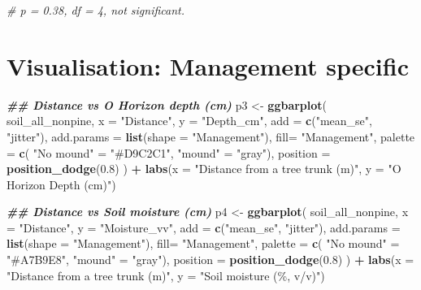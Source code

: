 \documentclass[
]{article}
\newenvironment{Shaded}{\begin{snugshade}}{\end{snugshade}}
\newcommand{\AttributeTok}[1]{\textcolor[rgb]{0.13,0.29,0.53}{#1}}
\newcommand{\CommentTok}[1]{\textcolor[rgb]{0.56,0.35,0.01}{\textit{#1}}}
\newcommand{\DocumentationTok}[1]{\textcolor[rgb]{0.56,0.35,0.01}{\textbf{\textit{#1}}}}
\newcommand{\FloatTok}[1]{\textcolor[rgb]{0.00,0.00,0.81}{#1}}
\newcommand{\FunctionTok}[1]{\textcolor[rgb]{0.13,0.29,0.53}{\textbf{#1}}}
\newcommand{\NormalTok}[1]{#1}
\newcommand{\OtherTok}[1]{\textcolor[rgb]{0.56,0.35,0.01}{#1}}
\newcommand{\SpecialCharTok}[1]{\textcolor[rgb]{0.81,0.36,0.00}{\textbf{#1}}}
\newcommand{\StringTok}[1]{\textcolor[rgb]{0.31,0.60,0.02}{#1}}
\begin{document}
\begin{Shaded}
\begin{Highlighting}[]
\CommentTok{\# p = 0.38, df = 4, not significant. }
\end{Highlighting}
\end{Shaded}

\section{Visualisation: Management
specific}\label{visualisation-management-specific}

\begin{Shaded}
\begin{Highlighting}[]
\DocumentationTok{\#\# Distance vs O Horizon depth (cm)}
\NormalTok{p3 }\OtherTok{\textless{}{-}} \FunctionTok{ggbarplot}\NormalTok{(}
\NormalTok{  soil\_all\_nonpine, }\AttributeTok{x =} \StringTok{"Distance"}\NormalTok{, }\AttributeTok{y =} \StringTok{"Depth\_cm"}\NormalTok{, }
  \AttributeTok{add =} \FunctionTok{c}\NormalTok{(}\StringTok{"mean\_se"}\NormalTok{, }\StringTok{"jitter"}\NormalTok{), }
  \AttributeTok{add.params =} \FunctionTok{list}\NormalTok{(}\AttributeTok{shape =} \StringTok{"Management"}\NormalTok{),}
  \AttributeTok{fill=} \StringTok{"Management"}\NormalTok{, }\AttributeTok{palette =} \FunctionTok{c}\NormalTok{(}
    \StringTok{"No mound"} \OtherTok{=} \StringTok{"\#D9C2C1"}\NormalTok{, }
    \StringTok{"mound"} \OtherTok{=} \StringTok{"gray"}\NormalTok{),}
  \AttributeTok{position =} \FunctionTok{position\_dodge}\NormalTok{(}\FloatTok{0.8}\NormalTok{)}
\NormalTok{) }\SpecialCharTok{+} 
  \FunctionTok{labs}\NormalTok{(}\AttributeTok{x =} \StringTok{"Distance from a tree trunk (m)"}\NormalTok{, }\AttributeTok{y =} \StringTok{"O Horizon Depth (cm)"}\NormalTok{)}

\DocumentationTok{\#\# Distance vs Soil moisture (cm)}
\NormalTok{p4 }\OtherTok{\textless{}{-}} \FunctionTok{ggbarplot}\NormalTok{(}
\NormalTok{  soil\_all\_nonpine, }\AttributeTok{x =} \StringTok{"Distance"}\NormalTok{, }\AttributeTok{y =} \StringTok{"Moisture\_vv"}\NormalTok{, }
  \AttributeTok{add =} \FunctionTok{c}\NormalTok{(}\StringTok{"mean\_se"}\NormalTok{, }\StringTok{"jitter"}\NormalTok{), }
  \AttributeTok{add.params =} \FunctionTok{list}\NormalTok{(}\AttributeTok{shape =} \StringTok{"Management"}\NormalTok{),}
  \AttributeTok{fill=} \StringTok{"Management"}\NormalTok{, }\AttributeTok{palette =} \FunctionTok{c}\NormalTok{(}
    \StringTok{"No mound"} \OtherTok{=} \StringTok{"\#A7B9E8"}\NormalTok{, }
    \StringTok{"mound"} \OtherTok{=} \StringTok{"gray"}\NormalTok{),}
  \AttributeTok{position =} \FunctionTok{position\_dodge}\NormalTok{(}\FloatTok{0.8}\NormalTok{)}
\NormalTok{) }\SpecialCharTok{+} 
  \FunctionTok{labs}\NormalTok{(}\AttributeTok{x =} \StringTok{"Distance from a tree trunk (m)"}\NormalTok{, }\AttributeTok{y =} \StringTok{"Soil moisture (\%, v/v)"}\NormalTok{)}


\end{Highlighting}
\end{Shaded}
\end{document}
